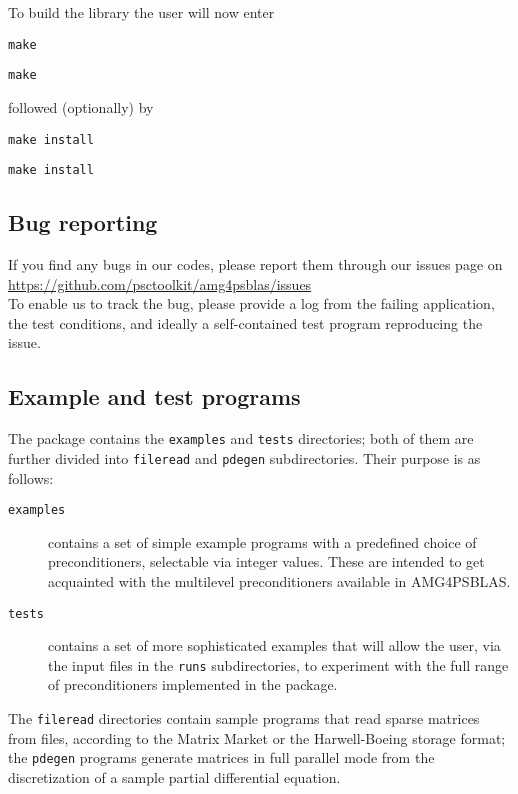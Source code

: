 To build the library the user will now enter
\ifpdf
\begin{verbatim}
make
\end{verbatim}
\else
\begin{verbatim}
make
\end{verbatim}
\fi
followed (optionally) by
\ifpdf
\begin{verbatim}
make install
\end{verbatim}
\else
\begin{verbatim}
make install
\end{verbatim}
\fi
\subsection{Bug reporting}
If you find any bugs in our codes, please report them through our
issues page on \\[2mm]
\url{https://github.com/psctoolkit/amg4psblas/issues}\\

To enable us to track the bug, please provide a log from the failing
application, the test conditions, and ideally a self-contained test
program reproducing the issue.

\subsection{Example and test programs\label{sec:ex_and_test}}
The package contains the \verb|examples| and \verb|tests| directories;
both of them are further divided into \verb|fileread| and
\verb|pdegen| subdirectories. Their purpose is as follows:
\begin{description}
\item[\tt examples] contains a set of simple example programs with a
  predefined choice of preconditioners, selectable via integer
  values. These are intended to get  acquainted with the
  multilevel preconditioners available in AMG4PSBLAS.
\item[\tt tests] contains a set of more sophisticated examples that
  will allow the user, via the input files in the \verb|runs|
  subdirectories, to experiment with the full range of preconditioners
  implemented in the package.
\end{description}
The \verb|fileread| directories contain sample programs that read
sparse matrices from files, according to the Matrix Market or the
Harwell-Boeing storage format; the \verb|pdegen| programs generate
matrices in full parallel mode from the discretization of a sample partial
differential equation.

